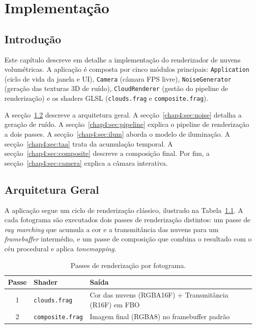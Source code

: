 \chapter{Implementação}
\label{chap:imp-test}

\section{Introdução}
\label{chap4:sec:intro}

Este capítulo descreve em detalhe a implementação do renderizador de nuvens volumétricas. A aplicação é composta por cinco módulos principais: \texttt{Application} (ciclo de vida da janela e UI), \texttt{Camera} (câmara FPS livre), \texttt{NoiseGenerator} (geração das texturas 3D de ruído), \texttt{CloudRenderer} (gestão do pipeline de renderização) e os shaders GLSL (\texttt{clouds.frag} e \texttt{composite.frag}).

A secção~\ref{chap4:sec:arq} descreve a arquitetura geral. A secção~\ref{chap4:sec:noise} detalha a geração de ruído. A secção~\ref{chap4:sec:pipeline} explica o pipeline de renderização a dois passes. A secção~\ref{chap4:sec:ilum} aborda o modelo de iluminação. A secção~\ref{chap4:sec:taa} trata da acumulação temporal. A secção~\ref{chap4:sec:composite} descreve a composição final. Por fim, a secção~\ref{chap4:sec:camera} explica a câmara interativa.

\section{Arquitetura Geral}
\label{chap4:sec:arq}

A aplicação segue um ciclo de renderização clássico, ilustrado na Tabela~\ref{tab:pipeline}. A cada fotograma são executados dois passes de renderização distintos: um passe de \emph{ray marching} que acumula a cor e a transmitância das nuvens para um \emph{framebuffer} intermédio, e um passe de composição que combina o resultado com o céu procedural e aplica \emph{tonemapping}.

\begin{table}[H]
\centering
\begin{tabular}{|c|l|l|}
\hline
\textbf{Passe} & \textbf{Shader} & \textbf{Saída} \\
\hline\hline
1 & \texttt{clouds.frag}    & Cor das nuvens (RGBA16F) + Transmitância (R16F) em FBO \\
\hline
2 & \texttt{composite.frag} & Imagem final (RGBA8) no framebuffer padrão \\
\hline
\end{tabular}
\caption{Passes de renderização por fotograma.}
\label{tab:pipeline}
\end{table}

